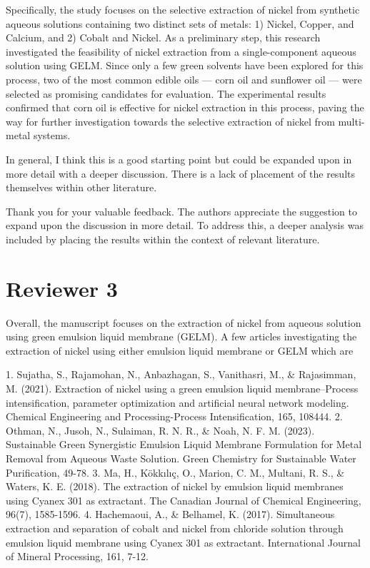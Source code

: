 \documentclass[11pt,answers]{exam}
\begin{document}
\begin{questions}
\begin{solutionorbox}
Specifically, the study focuses on the selective extraction of nickel from synthetic aqueous solutions containing two distinct sets of metals: 1) Nickel, Copper, and Calcium, and 2) Cobalt and Nickel. As a preliminary step, this research investigated the feasibility of nickel extraction from a single-component aqueous solution using GELM. Since only a few green solvents have been explored for this process, two of the most common edible oils — corn oil and sunflower oil — were selected as promising candidates for evaluation. The experimental results confirmed that corn oil is effective for nickel extraction in this process, paving the way for further investigation towards the selective extraction of nickel from multi-metal systems.


\end{solutionorbox}

\question In general, I think this is a good starting point but could be expanded upon in more detail with a deeper discussion.  There is a lack of placement of the results themselves within other literature.

\begin{solutionorbox}
Thank you for your valuable feedback. The authors appreciate the suggestion to expand upon the discussion in more detail. To address this, a deeper analysis was included by placing the results within the context of relevant literature. 
\end{solutionorbox}

\end{questions}

\newpage


\section*{Reviewer 3}
Overall, the manuscript focuses on the extraction of nickel from aqueous solution using green emulsion liquid membrane (GELM). A few articles investigating the extraction of nickel using either emulsion liquid membrane or GELM which are

1.      Sujatha, S., Rajamohan, N., Anbazhagan, S., Vanithasri, M., \& Rajasimman, M. (2021). Extraction of nickel using a green emulsion liquid membrane–Process intensification, parameter optimization and artificial neural network modeling. Chemical Engineering and Processing-Process Intensification, 165, 108444.
2.      Othman, N., Jusoh, N., Sulaiman, R. N. R., \& Noah, N. F. M. (2023). Sustainable Green Synergistic Emulsion Liquid Membrane Formulation for Metal Removal from Aqueous Waste Solution. Green Chemistry for Sustainable Water Purification, 49-78.
3.      Ma, H., Kökkılıç, O., Marion, C. M., Multani, R. S., \& Waters, K. E. (2018). The extraction of nickel by emulsion liquid membranes using Cyanex 301 as extractant. The Canadian Journal of Chemical Engineering, 96(7), 1585-1596.
4.      Hachemaoui, A., \& Belhamel, K. (2017). Simultaneous extraction and separation of cobalt and nickel from chloride solution through emulsion liquid membrane using Cyanex 301 as extractant. International Journal of Mineral Processing, 161, 7-12.
\end{document}
